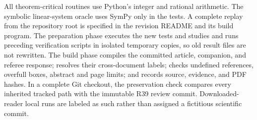 All theorem-critical routines use Python's integer and rational arithmetic. The symbolic linear-system oracle uses SymPy only in the tests. A complete replay from the repository root is specified in the revision README and its build program. The preparation phase executes the new tests and studies and runs preceding verification scripts in isolated temporary copies, so old result files are not rewritten. The build phase compiles the committed article, companion, and referee response; resolves their cross-document labels; checks undefined references, overfull boxes, abstract and page limits; and records source, evidence, and PDF hashes. In a complete Git checkout, the preservation check compares every inherited tracked path with the immutable R39 review commit. Downloaded-reader local runs are labeled as such rather than assigned a fictitious scientific commit.

